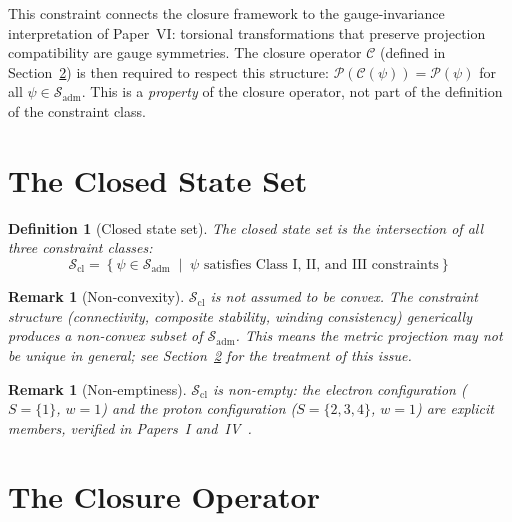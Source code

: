 \documentclass[12pt]{article}
\newtheorem{definition}[theorem]{Definition}
\newtheorem{remark}[theorem]{Remark}
\newcommand{\Ccal}{\mathcal{C}}
\newcommand{\Pcal}{\mathcal{P}}
\newcommand{\Sadm}{\mathcal{S}_{\mathrm{adm}}}
\newcommand{\Scl}{\mathcal{S}_{\mathrm{cl}}}
\begin{document}
This constraint connects the closure framework to the gauge-invariance interpretation of Paper~VI: torsional transformations that preserve projection compatibility are gauge symmetries. The closure operator $\Ccal$ (defined in Section~\ref{sec:operator}) is then required to respect this structure: $\Pcal(\Ccal(\psi)) = \Pcal(\psi)$ for all $\psi \in \Sadm$. This is a \textit{property} of the closure operator, not part of the definition of the constraint class.

\section{The Closed State Set}\label{sec:closed}

\begin{definition}[Closed state set]\label{def:closedset}
The closed state set is the intersection of all three constraint classes:
\begin{equation}
    \Scl = \left\{\psi \in \Sadm \;\middle|\; \psi \text{ satisfies Class I, II, and III constraints}\right\}
\end{equation}
\end{definition}

\begin{remark}[Non-convexity]
$\Scl$ is not assumed to be convex. The constraint structure (connectivity, composite stability, winding consistency) generically produces a non-convex subset of $\Sadm$. This means the metric projection may not be unique in general; see Section~\ref{sec:operator} for the treatment of this issue.
\end{remark}

\begin{remark}[Non-emptiness]
$\Scl$ is non-empty: the electron configuration ($S = \{1\}$, $w = 1$) and the proton configuration ($S = \{2,3,4\}$, $w = 1$) are explicit members, verified in Papers~I and~IV~\citep{SmartI, SmartIV}.
\end{remark}

\section{The Closure Operator}\label{sec:operator}
\end{document}
